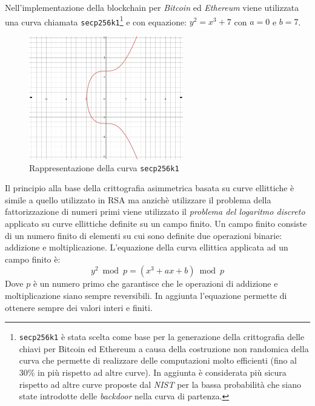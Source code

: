 Nell'implementazione della blockchain per \textit{Bitcoin} ed \textit{Ethereum} viene utilizzata una curva chiamata \texttt{secp256k1}\footnote{\texttt{secp256k1} è stata scelta come base per la generazione della crittografia delle chiavi per Bitcoin ed Ethereum a causa della costruzione non randomica della curva che permette di realizzare delle computazioni molto efficienti (fino al 30\% in più rispetto ad altre curve). In aggiunta è considerata più sicura rispetto ad altre curve proposte dal \textit{NIST} per la bassa probabilità che siano state introdotte delle \textit{backdoor} nella curva di partenza.} e con equazione: $y^2=x^3+7$ con $a=0$ e $b=7$.
\begin{figure}[H]
    \centering
    \includegraphics[width=0.6\textwidth]{images/secp256k1.png}
    \caption{Rappresentazione della curva \texttt{secp256k1}}
\end{figure}
Il principio alla base della crittografia asimmetrica basata su curve ellittiche è simile a quello utilizzato in RSA ma anzichè utilizzare il problema della fattorizzazione di numeri primi viene utilizzato il \textit{problema del logaritmo discreto} applicato su curve ellittiche definite su un campo finito.\newline
Un campo finito consiste di un numero finito di elementi su cui sono definite due operazioni binarie: addizione e moltiplicazione. L'equazione della curva ellittica applicata ad un campo finito è:
\begin{equation}
    y^2 \bmod p = (x^3 + ax + b) \bmod p
\end{equation}
Dove $p$ è un numero primo che garantisce che le operazioni di addizione e moltiplicazione siano sempre reversibili. In aggiunta l'equazione permette di ottenere sempre dei valori interi e finiti.\newline\newline
